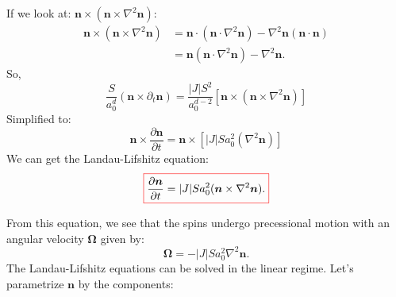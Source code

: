 If we look at: $\bm{n} \times (\bm{n} \times \nabla^2 \bm{n})$:
\begin{equation}
\begin{aligned}
\bm{n} \times (\bm{n} \times \nabla^2 \bm{n}) &= \bm{n} \cdot (\bm{n} \cdot \nabla^2 \bm{n}) - \nabla^2 \bm{n} (\bm{n} \cdot \bm{n}) \\
&= \bm{n} (\bm{n} \cdot \nabla^2 \bm{n}) - \nabla^2 \bm{n}.
\end{aligned}
\end{equation}
So,
\begin{equation}
\frac{S}{a_0^d} (\bm{n} \times \partial_t \bm{n}) = \frac{|J|S^2}{a_0^{d-2}} [\bm{n} \times (\bm{n} \times \nabla^2 \bm{n})]
\end{equation}
Simplified to:
\begin{equation}
\bm{n} \times \frac{\partial \bm{n}}{\partial t} = \bm{n} \times [|J| S a_0^2 (\nabla^2 \bm{n})]
\end{equation}
We can get the Landau-Lifshitz equation:
\begin{equation}
    \colorboxed{
    \frac{\partial \bm{n}}{\partial t} = |J| S a_0^2 (\bm{n} \times \nabla^2 \bm{n}).
    }
\end{equation}

From this equation, we see that the spins undergo precessional motion with an angular velocity $\bm{\Omega}$ given by:
\begin{equation}
\bm{\Omega} = -|J|S a_0^2 \nabla^2 \bm{n}.
\end{equation}
The Landau-Lifshitz equations can be solved in the linear regime. Let's parametrize $\bm{n}$ by the components:


